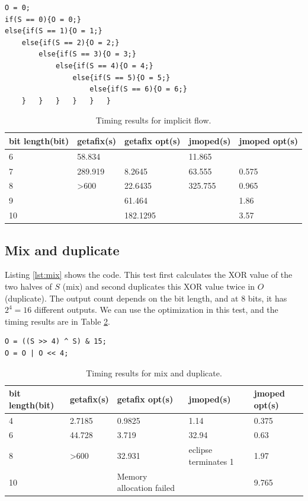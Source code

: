 \lstset{language=C}  
\begin{lstlisting}[caption={Implict flow test program.},label=lst:implicit]
O = 0;
if(S == 0){O = 0;}
else{if(S == 1){O = 1;}
	else{if(S == 2){O = 2;}
		else{if(S == 3){O = 3;}
			else{if(S == 4){O = 4;}
				else{if(S == 5){O = 5;}
					else{if(S == 6){O = 6;}
	}	}	}	}	}	}
\end{lstlisting}

\begin{table}[htbp]
\begin{tabular}{|l|l|l|l|l|}
\hline
{bit length(bit)} & getafix(s) & {getafix opt(s)} & jmoped(s) & {jmoped opt(s)} \\ \hline
6 & {58.834} & {} & {11.865} & {} \\ \hline
7 & {289.919} & 8.2645 & {63.555} & 0.575 \\ \hline
8 & \textgreater 600 & 22.6435 & {325.755} & 0.965 \\ \hline
9 &  & 61.464 &  & 1.86 \\ \hline
10 &  & 182.1295 &  & 3.57 \\ \hline
\end{tabular}
\caption{Timing results for implicit flow.}
\label{tbl:implicit}
\end{table}

\subsection{Mix and duplicate}
Listing \ref{lst:mix} shows the code. This test first calculates the XOR value of the two halves of $S$ (mix) and second duplicates this XOR value twice in $O$ (duplicate). The output count depends on the bit length, and at $8$ bits, it has $2^{4} = 16$ different outputs. We can use the optimization in this test, and the timing results are in Table \ref{tbl:mix}.

\lstset{language=C}  
\begin{lstlisting}[caption={Mix and duplicate test program at 8 bits.},label=lst:mix]
O = ((S >> 4) ^ S) & 15;
O = O | O << 4;
\end{lstlisting}

\begin{table}[htbp]
\begin{tabular}{|l|l|l|l|l|}
\hline
{bit length(bit)} & getafix(s) & {getafix opt(s)} & jmoped(s) & {jmoped opt(s)} \\ \hline
4 & {2.7185} & 0.9825 & {1.14} & 0.375 \\ \hline
6 & {44.728} & 3.719 & {32.94} & 0.63 \\ \hline
8 & \textgreater 600 & 32.931 & eclipse terminates 1 & 1.97 \\ \hline
10 &  & {Memory allocation failed} &  & 9.765 \\ \hline
\end{tabular}
\caption{Timing results for mix and duplicate.}
\label{tbl:mix}
\end{table}

